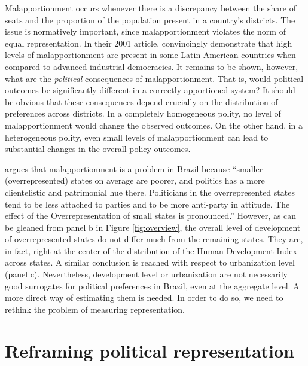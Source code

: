 Malapportionment occurs whenever there is a discrepancy between the share of seats and the proportion of the population present in a country's districts. The issue is normatively important, since malapportionment violates the norm of equal representation. In their 2001 article, \cite{Samuels:2001} convincingly demonstrate that high levels of malapportionment are present in some Latin American countries when compared to  advanced industrial democracies. It remains to be shown, however, what are the \emph{political} consequences of malapportionment. That is, would political outcomes be significantly different in a correctly apportioned system? It should be obvious that  these consequences depend crucially on the distribution of preferences across  districts. In a completely homogeneous polity, no level of malapportionment would change the observed outcomes. On the other hand, in a heterogeneous polity, even small levels of malapportionment can lead to substantial changes in the overall policy outcomes. 

\citet[][p.263]{mainwaring:1999} argues  that malapportionment is a problem in Brazil because ``smaller (overrepresented) states on average are poorer, and politics has a more clientelistic and patrimonial hue there. Politicians in the overrepresented states tend to be less attached to parties and to be more anti-party in attitude. The effect of the Overrepresentation of small states is pronounced.'' However, as can be gleaned from panel b in Figure \ref{fig:overview}, the overall level of development of overrepresented states do not differ much from the remaining states. They are, in fact,  right at the center of the distribution of the Human Development Index across states. A similar conclusion is reached with  respect to urbanization level (panel c). Nevertheless, development level or urbanization  are not necessarily good surrogates for political preferences in Brazil, even at the aggregate level. A more direct way of estimating them is needed. In order to do so, we need to rethink the problem of measuring representation.




\section{Reframing political representation}

